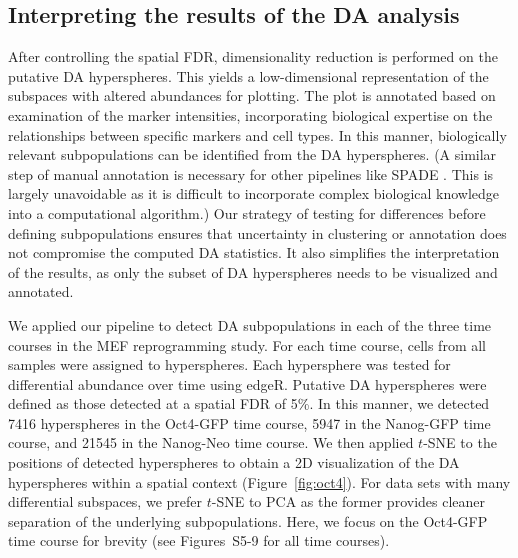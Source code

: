 \documentclass{article}
\newcommand{\suppfigrealextra}{S5-9}
\begin{document}
\subsection{Interpreting the results of the DA analysis}
After controlling the spatial FDR, dimensionality reduction is performed on the putative DA hyperspheres.
This yields a low-dimensional representation of the subspaces with altered abundances for plotting.
The plot is annotated based on examination of the marker intensities, incorporating biological expertise on the relationships between specific markers and cell types.
In this manner, biologically relevant subpopulations can be identified from the DA hyperspheres.
(A similar step of manual annotation is necessary for other pipelines like SPADE \cite{anchang2016visualization}.
This is largely unavoidable as it is difficult to incorporate complex biological knowledge into a computational algorithm.)
Our strategy of testing for differences before defining subpopulations ensures that uncertainty in clustering or annotation does not compromise the computed DA statistics.
It also simplifies the interpretation of the results, as only the subset of DA hyperspheres needs to be visualized and annotated.

We applied our pipeline to detect DA subpopulations in each of the three time courses in the MEF reprogramming study.
For each time course, cells from all samples were assigned to hyperspheres.
Each hypersphere was tested for differential abundance over time using edgeR.
Putative DA hyperspheres were defined as those detected at a spatial FDR of 5\%.
In this manner, we detected 7416 hyperspheres in the Oct4-GFP time course, 5947 in the Nanog-GFP time course, and 21545 in the Nanog-Neo time course.
We then applied $t$-SNE \cite{van2008visualizing} to the positions of detected hyperspheres to obtain a 2D visualization of the DA hyperspheres within a spatial context (Figure~\ref{fig:oct4}).
For data sets with many differential subspaces, we prefer $t$-SNE to PCA as the former provides cleaner separation of the underlying subpopulations.
Here, we focus on the Oct4-GFP time course for brevity (see Figures~\suppfigrealextra{} for all time courses).
\end{document}
